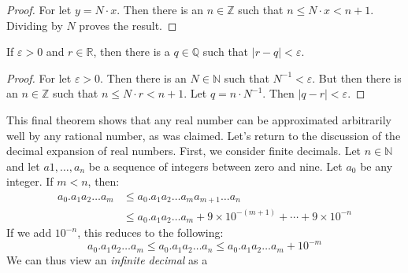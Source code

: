 \documentclass[crop=false,class=book,oneside]{standalone}
\begin{document}
            \begin{proof}
                For let $y=N\cdot{x}$. Then there is an
                $n\in\mathbb{Z}$ such that
                $n\leq{N}\cdot{x}<n+1$. Dividing by $N$ proves
                the result.
            \end{proof}
            \begin{theorem}
                If $\varepsilon>0$ and $r\in\mathbb{R}$, then
                there is a $q\in\mathbb{Q}$ such that
                $|r-q|<\varepsilon$.
            \end{theorem}
            \begin{proof}
                For let $\varepsilon>0$. Then there is an
                $N\in\mathbb{N}$ such that
                $N^{\minus{1}}<\varepsilon$. But then there is
                an $n\in\mathbb{Z}$ such that
                $n\leq{N}\cdot{r}<n+1$. Let
                $q=n\cdot{N}^{\minus{1}}$. Then
                $|q-r|<\varepsilon$.
            \end{proof}
            This final theorem shows that any real number can
            be approximated arbitrarily well by any rational number,
            as was claimed. Let's return to the discussion of
            the decimal expansion of real numbers. First, we
            consider finite decimals. Let $n\in\mathbb{N}$ and
            let $a{1},\dots,a_{n}$ be a sequence of integers between
            zero and nine. Let $a_{0}$ be any integer. If
            $m<n$, then:
            \begin{equation}
                \begin{split}
                    a_{0}.a_{1}a_{2}\dots{a}_{m}&\leq
                    a_{0}.a_{1}a_{2}\dots{a}_{m}a_{m+1}
                    \dots{a}_{n}\\
                    &\leq
                    a_{0}.a_{1}a_{2}\dots{a}_{m}
                    +9\times{10}^{\minus(m+1)}+\cdots
                    +9\times{10}^{\minus{n}}
                \end{split}
            \end{equation}
            If we add $10^{\minus{n}}$, this reduces to the
            following:
            \begin{equation}
                a_{0}.a_{1}a_{2}\dots{a}_{m}\leq
                a_{0}.a_{1}a_{2}\dots{a}_{n}\leq
                a_{0}.a_{1}a_{2}\dots{a}_{m}+10^{\minus{m}}
            \end{equation}
            We can thus view an \textit{infinite decimal} as a
\end{document}
